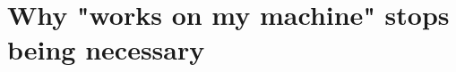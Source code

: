 \chapter{Why "works on my machine" stops being necessary}
\label{ch:why-works-on-my-machine-stops-being}

